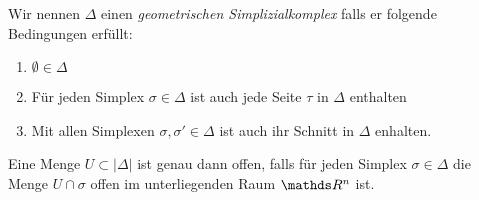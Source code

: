 \begin{Def}
  Wir nennen $\Delta$ einen \textit{geometrischen Simplizialkomplex} 
  falls er folgende Bedingungen erfüllt:
  \begin{enumerate}[(K1)]
  	\item $\emptyset \in \Delta$
  	\item Für jeden Simplex $\sigma \in \Delta$ ist auch jede Seite $\tau$ in $\Delta$ enthalten
  	\item Mit allen Simplexen $\sigma, \sigma' \in \Delta$ ist auch ihr Schnitt in $\Delta$ enhalten.
  \end{enumerate}
\end{Def}

\begin{Def}
	Eine Menge $U \subset  \left| \Delta \right|$ ist genau dann offen, falls für jeden Simplex $\sigma \in \Delta$ die Menge $U \cap \sigma$ offen im unterliegenden Raum $\R^n$ ist. 
\end{Def}
















